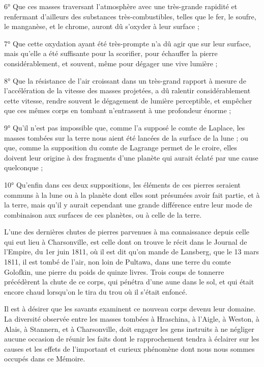 \documentclass[a4paper, 12pt, oneside, french]{article}
\begin{document}
6° Que ces masses traversant l'atmosphère avec une très-grande rapidité et renfermant d'ailleurs des substances très-combustibles, telles que le fer, le soufre, le manganèse, et le chrome, auront dû s'oxyder à leur surface ;

7° Que cette oxydation ayant été très-prompte n'a dû agir que sur leur surface, mais qu'elle a été suffisante pour la scorifier, pour échauffer la pierre considérablement, et souvent, même pour dégager une vive lumière ;

8° Que la résistance de l'air croissant dans un très-grand rapport à mesure de l'accélération de la vitesse des masses projetées, a dû ralentir considérablement cette vitesse, rendre souvent le dégagement de lumière perceptible, et empêcher que ces mêmes corps en tombant n'entrassent à une profondeur énorme ;

9° Qu'il n'est pas impossible que, comme l'a supposé le comte de Laplace, les masses tombées sur la terre nous aient été lancées de la surface de la lune ; ou que, comme la supposition du comte de Lagrange permet de le croire, elles doivent leur origine à des fragments d'une planète qui aurait éclaté par une cause quelconque ;

10° Qu'enfin dans ces deux suppositions, les éléments de ces pierres seraient communs à la lune ou à la planète dont elles sont présumées avoir fait partie, et à la terre, mais qu'il y aurait cependant une grande différence entre leur mode de combinaison aux surfaces de ces planètes, ou à celle de la terre.

L'une des dernières chutes de pierres parvenues à ma connaissance depuis celle qui eut lieu à Charsonville, est celle dont on trouve le récit dans le Journal de l'Empire, du 1er juin 1811, où il est dit qu'on mande de Lansberg, que le 13 mars 1811, il est tombé de l'air, non loin de Pultawa, dans une terre du comte Golofkin, une pierre du poids de quinze livres. Trois coups de tonnerre précédèrent la chute de ce corps, qui pénétra d'une aune dans le sol, et qui était encore chaud lorsqu'on le tira du trou où il s'était enfoncé.

Il est à désirer que les savants examinent ce nouveau corps devenu leur domaine. La diversité observée entre les masses tombées à Hraschina, à l'Aigle, à Weston, à Alais, à Stannern, et à Charsonville, doit engager les gens instruits à ne négliger aucune occasion de réunir les faits dont le rapprochement tendra à éclairer sur les causes et les effets de l'important et curieux phénomène dont nous nous sommes occupés dans ce Mémoire.
\end{document}
